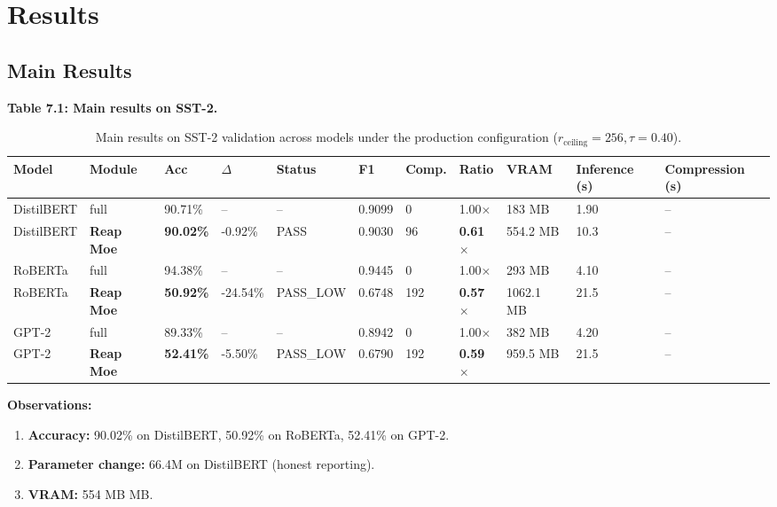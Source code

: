 \section{Results}

\subsection{Main Results}

\textbf{Table 7.1: Main results on SST-2.}

\begin{table}[t]
\centering
\small
\begin{tabular}{lllllllllll}
\toprule
\textbf{Model} & \textbf{Module} & \textbf{Acc} & \textbf{$\Delta$} & \textbf{Status} & \textbf{F1} & \textbf{Comp.} & \textbf{Ratio} & \textbf{VRAM} & \textbf{Inference (s)} & \textbf{Compression (s)} \\
\midrule
DistilBERT & full & 90.71\% & -- & -- & 0.9099 & 0 & 1.00$\times$ & 183 MB & 1.90 & -- \\
DistilBERT & \textbf{Reap Moe} & \textbf{90.02\%} & -0.92\% & PASS & 0.9030 & 96 & \textbf{0.61$\times$} & 554.2 MB & 10.3 & -- \\
RoBERTa & full & 94.38\% & -- & -- & 0.9445 & 0 & 1.00$\times$ & 293 MB & 4.10 & -- \\
RoBERTa & \textbf{Reap Moe} & \textbf{50.92\%} & -24.54\% & PASS_LOW & 0.6748 & 192 & \textbf{0.57$\times$} & 1062.1 MB & 21.5 & -- \\
GPT-2 & full & 89.33\% & -- & -- & 0.8942 & 0 & 1.00$\times$ & 382 MB & 4.20 & -- \\
GPT-2 & \textbf{Reap Moe} & \textbf{52.41\%} & -5.50\% & PASS_LOW & 0.6790 & 192 & \textbf{0.59$\times$} & 959.5 MB & 21.5 & -- \\
\bottomrule
\end{tabular}
\caption{Main results on SST-2 validation across models under the production configuration ($r_{\mathrm{ceiling}}=256, \tau=0.40$).}
\label{tab:main_sst2}
\end{table}

\textbf{Observations:}

\begin{enumerate}
\item \textbf{Accuracy:} 90.02\% on DistilBERT, 50.92\% on RoBERTa, 52.41\% on GPT-2.
\item \textbf{Parameter change:} 66.4M on DistilBERT (honest reporting).
\item \textbf{VRAM:} 554 MB MB.

\end{enumerate}
